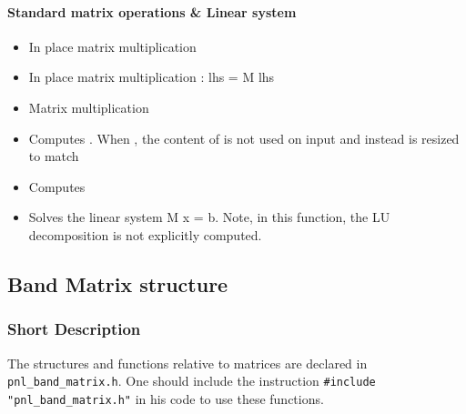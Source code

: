 \paragraph{Standard matrix operations \& Linear system}
\begin{itemize}
\item {}
  \sshortdescribe In place matrix multiplication  
\item {}
  \sshortdescribe In place matrix multiplication : lhs = M lhs  
\item {}
  \sshortdescribe Matrix multiplication  
\item {} 
  \sshortdescribe Computes . When , the
  content of  is not used on input and instead  is resized to
  match 
\item {}
  \sshortdescribe Computes 
\item {}
  \sshortdescribe Solves the linear system M x = b. Note, in this function, the LU decomposition
  is not explicitly computed.
\end{itemize}



\subsection{Band Matrix structure}
\subsubsection{Short Description}

The structures and functions relative to matrices are declared in
\verb!pnl_band_matrix.h!. One should include the instruction
\verb!#include "pnl_band_matrix.h"! in his code to use these functions.


